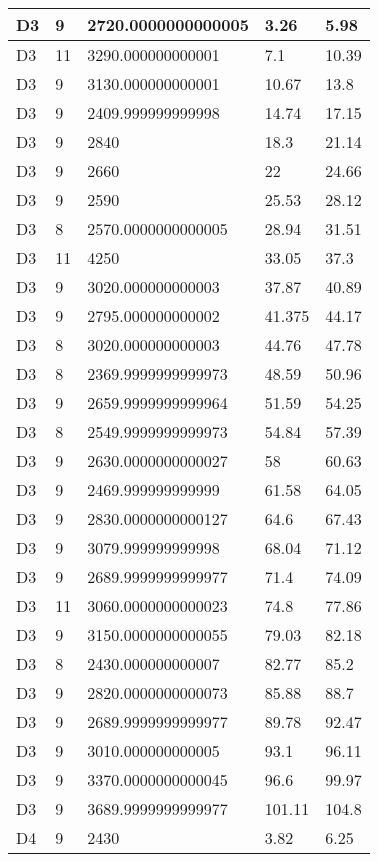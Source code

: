 \begin{longtable}{|l|l|l|l|l|}
D3 & 9 & 2720.0000000000005 & 3.26 & 5.98 \\ \hline
D3 & 11 & 3290.000000000001 & 7.1 & 10.39 \\ \hline
D3 & 9 & 3130.000000000001 & 10.67 & 13.8 \\ \hline
D3 & 9 & 2409.999999999998 & 14.74 & 17.15 \\ \hline
D3 & 9 & 2840 & 18.3 & 21.14 \\ \hline
D3 & 9 & 2660 & 22 & 24.66 \\ \hline
D3 & 9 & 2590 & 25.53 & 28.12 \\ \hline
D3 & 8 & 2570.0000000000005 & 28.94 & 31.51 \\ \hline
D3 & 11 & 4250 & 33.05 & 37.3 \\ \hline
D3 & 9 & 3020.000000000003 & 37.87 & 40.89 \\ \hline
D3 & 9 & 2795.000000000002 & 41.375 & 44.17 \\ \hline
D3 & 8 & 3020.000000000003 & 44.76 & 47.78 \\ \hline
D3 & 8 & 2369.9999999999973 & 48.59 & 50.96 \\ \hline
D3 & 9 & 2659.9999999999964 & 51.59 & 54.25 \\ \hline
D3 & 8 & 2549.9999999999973 & 54.84 & 57.39 \\ \hline
D3 & 9 & 2630.0000000000027 & 58 & 60.63 \\ \hline
D3 & 9 & 2469.999999999999 & 61.58 & 64.05 \\ \hline
D3 & 9 & 2830.0000000000127 & 64.6 & 67.43 \\ \hline
D3 & 9 & 3079.999999999998 & 68.04 & 71.12 \\ \hline
D3 & 9 & 2689.9999999999977 & 71.4 & 74.09 \\ \hline
D3 & 11 & 3060.0000000000023 & 74.8 & 77.86 \\ \hline
D3 & 9 & 3150.0000000000055 & 79.03 & 82.18 \\ \hline
D3 & 8 & 2430.000000000007 & 82.77 & 85.2 \\ \hline
D3 & 9 & 2820.0000000000073 & 85.88 & 88.7 \\ \hline
D3 & 9 & 2689.9999999999977 & 89.78 & 92.47 \\ \hline
D3 & 9 & 3010.000000000005 & 93.1 & 96.11 \\ \hline
D3 & 9 & 3370.0000000000045 & 96.6 & 99.97 \\ \hline
D3 & 9 & 3689.9999999999977 & 101.11 & 104.8 \\ \hline
D4 & 9 & 2430 & 3.82 & 6.25 \\ \hline

\end{longtable}
